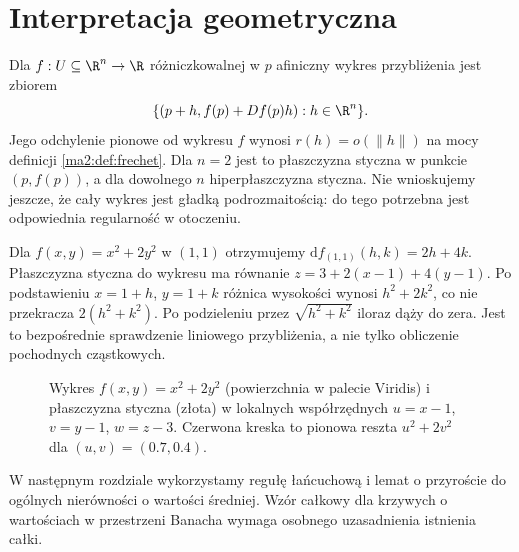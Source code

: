 \section{Interpretacja geometryczna}

Dla $f:U\subseteq\R^n\to\R$ różniczkowalnej
w $p$ afiniczny wykres przybliżenia jest zbiorem
\[
 \{(p+h,f(p)+Df(p)h):h\in\R^n\}.
\]
Jego odchylenie pionowe od wykresu $f$ wynosi
$r(h)=o(\|h\|)$ na mocy definicji
\ref{ma2:def:frechet}. Dla $n=2$ jest to płaszczyzna
styczna w punkcie $(p,f(p))$, a dla dowolnego $n$
hiperpłaszczyzna styczna. Nie wnioskujemy jeszcze,
że cały wykres jest gładką podrozmaitością:
do tego potrzebna jest odpowiednia regularność w otoczeniu.

\begin{przyklad}
Dla $f(x,y)=x^2+2y^2$ w $(1,1)$ otrzymujemy
$\mathrm df_{(1,1)}(h,k)=2h+4k$.
Płaszczyzna styczna do wykresu ma równanie
$z=3+2(x-1)+4(y-1)$.
Po podstawieniu $x=1+h$, $y=1+k$ różnica wysokości
wynosi $h^2+2k^2$, co nie przekracza $2(h^2+k^2)$.
Po podzieleniu przez $\sqrt{h^2+k^2}$ iloraz dąży
do zera. Jest to bezpośrednie sprawdzenie
liniowego przybliżenia, a nie tylko obliczenie
pochodnych cząstkowych.
\end{przyklad}

\begin{figure}[htbp]
\centering
{}
\caption{Wykres $f(x,y)=x^2+2y^2$ (powierzchnia w palecie Viridis)
i płaszczyzna styczna (złota) w lokalnych
współrzędnych $u=x-1$, $v=y-1$, $w=z-3$.
Czerwona kreska to pionowa reszta $u^2+2v^2$
dla $(u,v)=(0.7,0.4)$.}
\label{ma2:fig:tangent-plane-3d}
\end{figure}

W następnym rozdziale wykorzystamy regułę łańcuchową
i lemat o przyroście do ogólnych nierówności o wartości
średniej. Wzór całkowy dla krzywych o wartościach
w przestrzeni Banacha wymaga osobnego uzasadnienia
istnienia całki.

